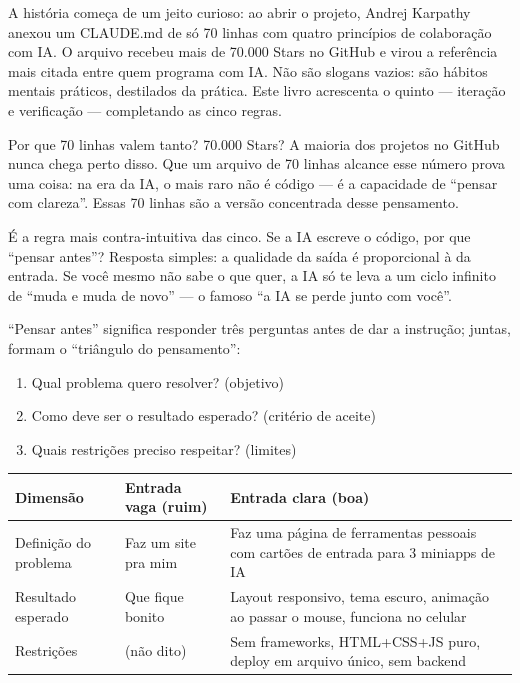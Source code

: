

A história começa de um jeito curioso: ao abrir o projeto, Andrej Karpathy anexou um CLAUDE.md de só 70 linhas com quatro princípios de colaboração com IA. O arquivo recebeu mais de 70.000 Stars no GitHub e virou a referência mais citada entre quem programa com IA. Não são slogans vazios: são hábitos mentais práticos, destilados da prática. Este livro acrescenta o quinto — iteração e verificação — completando as cinco regras.

\begin{tcbinfo}{Por que 70 linhas valem tanto?}
70.000 Stars? A maioria dos projetos no GitHub nunca chega perto disso. Que um arquivo de 70 linhas alcance esse número prova uma coisa: na era da IA, o mais raro não é código — é a capacidade de “pensar com clareza”. Essas 70 linhas são a versão concentrada desse pensamento.

\end{tcbinfo}


É a regra mais contra-intuitiva das cinco. Se a IA escreve o código, por que “pensar antes”? Resposta simples: a qualidade da saída é proporcional à da entrada. Se você mesmo não sabe o que quer, a IA só te leva a um ciclo infinito de “muda e muda de novo” — o famoso “a IA se perde junto com você”.

“Pensar antes” significa responder três perguntas antes de dar a instrução; juntas, formam o “triângulo do pensamento”:

\begin{enumerate}
  \item Qual problema quero resolver? (objetivo)
  \item Como deve ser o resultado esperado? (critério de aceite)
  \item Quais restrições preciso respeitar? (limites)
\end{enumerate}

\begin{center}
\begin{tabularx}{\linewidth}{|X|X|X|}
\hline
\textbf{Dimensão} & \textbf{Entrada vaga (ruim)} & \textbf{Entrada clara (boa)} \tabularnewline
\hline
Definição do problema & Faz um site pra mim & Faz uma página de ferramentas pessoais com cartões de entrada para 3 miniapps de IA \tabularnewline
Resultado esperado & Que fique bonito & Layout responsivo, tema escuro, animação ao passar o mouse, funciona no celular \tabularnewline
Restrições & (não dito) & Sem frameworks, HTML+CSS+JS puro, deploy em arquivo único, sem backend \tabularnewline
\hline
\end{tabularx}
\end{center}

